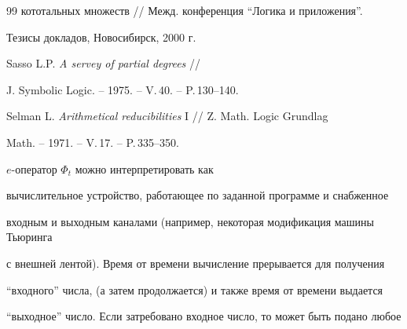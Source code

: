\begin{thebibliography}{99}
{кототальных множеств} //  Межд. конференция ``Логика и приложения''.


Тезисы докладов, Новосибирск, 2000 г.




Sasso L.P. {\em A servey of partial degrees} //


J. Symbolic Logic. -- 1975. -- V.\,40. -- P.\,130--140.




Selman L. {\em Arithmetical reducibilities} I // Z. Math. Logic Grundlag


Math. -- 1971. -- V.\,17. -- P.\,335--350.





\end{thebibliography}





\vskip 2cm












\label{end}





























$e$-оператор $\Phi_t$ можно интерпретировать как


вычислительное устройство, работающее по заданной программе и снабженное


входным и выходным каналами (например, некоторая модификация машины Тьюринга


с внешней лентой). Время от времени вычисление прерывается для получения


``входного'' числа, (а затем продолжается) и также время от времени выдается


``выходное'' число. Если затребовано входное число, то может быть подано любое


